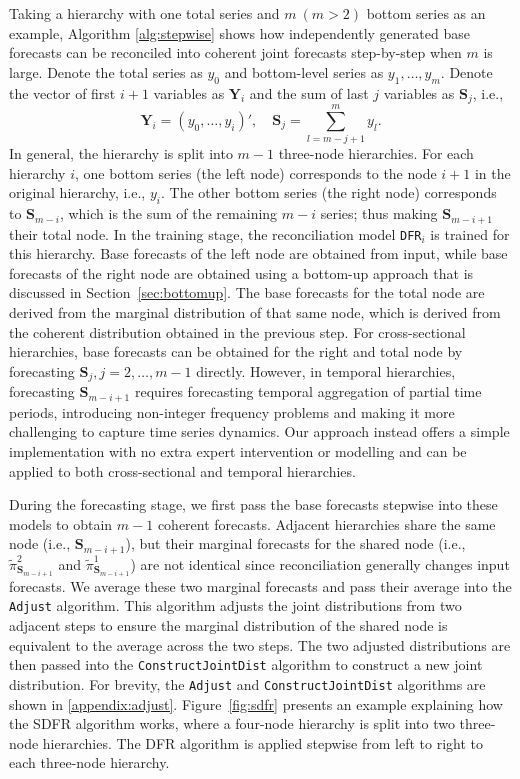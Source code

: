 \documentclass[a4paper,review,11pt,authoryear]{elsarticle}
\let\code=\texttt
\newcommand{\bY}{\mathbf{Y}}
\theoremstyle{definition}
\begin{document}
  Taking a hierarchy with one total series and $m~(m>2)$ bottom series as an example, Algorithm \ref{alg:stepwise} shows how independently generated base forecasts can be reconciled into coherent joint forecasts step-by-step when $m$ is large.
  Denote the total series as $y_0$ and bottom-level series as $y_1, \dots, y_m$.
  Denote the vector of first $i+1$ variables as $\mathbf{Y}_i$ and the sum of last $j$ variables as $\mathbf{S}_j$, i.e.,
  \[
    \bY_i = (y_0, \dots, y_i)', \quad \mathbf{S}_j = \sum_{l=m-j+1}^{m} y_l.
  \]
  In general, the hierarchy is split into $m-1$ three-node hierarchies.
  For each hierarchy $i$, one bottom series (the left node) corresponds to the node $i+1$ in the original hierarchy, i.e., $y_{i}$. The other bottom series (the right node) corresponds to $\mathbf{S}_{m-i}$, which is the sum of the remaining $m-i$ series; thus making $\mathbf{S}_{m-i+1}$ their total node.
  In the training stage, the reconciliation model \code{DFR}$_i$ is trained for this hierarchy.
  Base forecasts of the left node are obtained from input, while base forecasts of the right node are obtained using a bottom-up approach that is discussed in Section~\ref{sec:bottomup}.
  The base forecasts for the total node are derived from the marginal distribution of that same node, which is derived from the coherent distribution obtained in the previous step.
  For cross-sectional hierarchies, base forecasts can be obtained for the right and total node by forecasting $\mathbf{S}_{j}, j=2,\dots,m-1$ directly.
  However, in temporal hierarchies, forecasting $\mathbf{S}_{m-i+1}$ requires forecasting temporal aggregation of partial time periods, introducing non-integer frequency problems and making it more challenging to capture time series dynamics.
  Our approach instead offers a simple implementation with no extra expert intervention or modelling and can be applied to both cross-sectional and temporal hierarchies.

  During the forecasting stage, we first pass the base forecasts stepwise into these models to obtain $m-1$ coherent forecasts.
  Adjacent hierarchies share the same node (i.e., $\mathbf{S}_{m-i+1}$), but their marginal forecasts for the shared node (i.e., $\tilde\pi^{2}_{\mathbf{S}_{m-i+1}}$ and $\tilde\pi^{1}_{\mathbf{S}_{m-i+1}}$) are not identical since reconciliation generally changes input forecasts.
  We average these two marginal forecasts and pass their average into the \code{Adjust} algorithm. This algorithm adjusts the joint distributions from two adjacent steps to ensure the marginal distribution of the shared node is equivalent to the average across the two steps.
  The two adjusted distributions are then passed into the \code{ConstructJointDist} algorithm to construct a new joint distribution.
  For brevity, the \code{Adjust} and \code{ConstructJointDist} algorithms are shown in \ref{appendix:adjust}.
  Figure~\ref{fig:sdfr} presents an example explaining how the SDFR algorithm works, where a four-node hierarchy is split into two three-node hierarchies. The DFR algorithm is applied stepwise from left to right to each three-node hierarchy.
\end{document}
